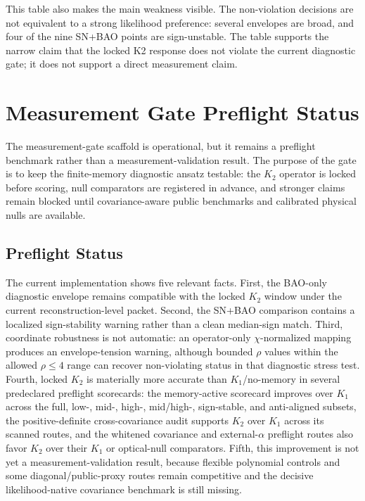 \documentclass[11pt]{article}
\begin{document}
This table also makes the main weakness visible. The non-violation decisions are not
equivalent to a strong likelihood preference: several envelopes are broad, and
four of the nine SN+BAO points are sign-unstable. The table supports the narrow
claim that the locked K2 response does not violate the current diagnostic gate;
it does not support a direct measurement claim.

\section{Measurement Gate Preflight Status}

The measurement-gate scaffold is operational, but it remains a preflight
benchmark rather than a measurement-validation result. The purpose of the gate
is to keep the finite-memory diagnostic ansatz testable: the $K_2$ operator is
locked before scoring, null comparators are registered in advance, and stronger
claims remain blocked until covariance-aware public benchmarks and calibrated
physical nulls are available.

\subsection{Preflight Status}

The current implementation shows five relevant facts. First, the BAO-only
diagnostic envelope remains compatible with the locked $K_2$ window under the
current reconstruction-level packet. Second, the SN+BAO comparison contains a
localized sign-stability warning rather than a clean median-sign match. Third,
coordinate robustness is not automatic: an operator-only $\chi$-normalized mapping
produces an envelope-tension warning, although bounded $\rho$ values within the
allowed $\rho \leq 4$ range can recover non-violating status in that diagnostic
stress test. Fourth, locked $K_2$ is materially more accurate than $K_1$/no-memory in
several predeclared preflight scorecards: the memory-active scorecard improves
over $K_1$ across the full, low-, mid-, high-, mid/high-, sign-stable, and
anti-aligned subsets, the positive-definite cross-covariance audit supports $K_2$
over $K_1$ across its scanned routes, and the whitened covariance and external-$\alpha$
preflight routes also favor $K_2$ over their $K_1$ or optical-null comparators. Fifth,
this improvement is not yet a measurement-validation result, because flexible
polynomial controls and some diagonal/public-proxy routes remain competitive and
the decisive likelihood-native covariance benchmark is still missing.
\end{document}
